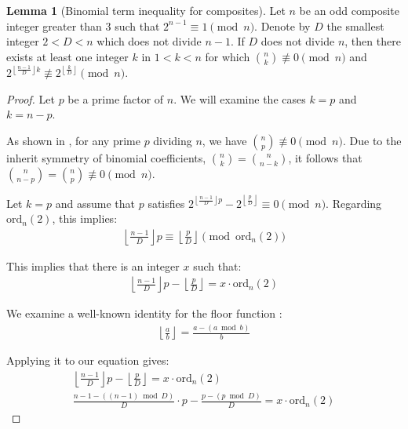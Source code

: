 \documentclass{article}
\theoremstyle{plain}
\theoremstyle{definition}
\newtheorem{lemma}{Lemma}
\newcommand{\floor}[1]{\left\lfloor #1 \right\rfloor}
\newcommand{\ordn}[1]{\text{ord}_n(#1)}
\begin{document}
\begin{lemma}[Binomial term inequality for composites] \label{lemma:compositeterminequality}
Let \( n \) be an odd composite integer greater than $3$ such that \( 2^{n-1} \equiv 1 \pmod{n} \). Denote by \( D \) the smallest integer \(2 < D < n \) which does not divide \( n-1 \). If $D$ does not divide $n$, then there exists at least one integer $k$ in $1 < k < n$ for which $\binom{n}{k} \not\equiv 0 \pmod{n}$ and $2^{\left\lfloor \frac{n-1}{D} \right\rfloor k} \not\equiv 2^{\left\lfloor \frac{k}{D} \right\rfloor} \pmod{n}$.
\end{lemma}
\begin{proof}
Let \( p \) be a prime factor of \( n \). We will examine the cases \( k = p \) and \( k = n - p \).

As shown in \cite{ogilvy1956binomial}, for any prime \( p \) dividing \( n \), we have \( \binom{n}{p} \not\equiv 0 \pmod{n} \). Due to the inherit symmetry of binomial coefficients, $\binom{n}{k} = \binom{n}{n-k}$, it follows that $\binom{n}{n-p} = \binom{n}{p} \not\equiv 0 \pmod{n}$.

Let $k=p$ and assume that $p$ satisfies $2^{\left\lfloor \frac{n-1}{D} \right\rfloor p} - 2^{\left\lfloor \frac{p}{D} \right\rfloor} \equiv 0 \pmod{n}$. Regarding $\text{ord}_n(2)$, this implies: 
\begin{align}
    \left\lfloor \frac{n-1}{D} \right\rfloor p \equiv \left\lfloor \frac{p}{D} \right\rfloor \pmod{\ordn{2}} 
\end{align}

This implies that there is an integer $x$ such that:
\begin{align}
    \left\lfloor \frac{n-1}{D} \right\rfloor p - \left\lfloor \frac{p}{D} \right\rfloor = x \cdot \ordn{2} 
\end{align}

We examine a well-known identity for the floor function \cite{niven2008introduction}:
\begin{align}
    \floor{\frac{a}{b}} = \frac{a - (a \bmod{b})}{b}
\end{align}

Applying it to our equation gives:
\begin{align}
    \left\lfloor \frac{n-1}{D} \right\rfloor p - \left\lfloor \frac{p}{D} \right\rfloor = x \cdot \ordn{2} \\
    \frac{n-1 - ((n-1) \bmod{D})}{D} \cdot p - \frac{p - (p \bmod{D})}{D} = x \cdot \ordn{2} 
\end{align}


\end{proof}
\end{document}
